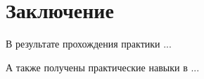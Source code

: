 \newpage
\section{Заключение}
	В результате прохождения практики ...

	А также получены практические навыки в ...

